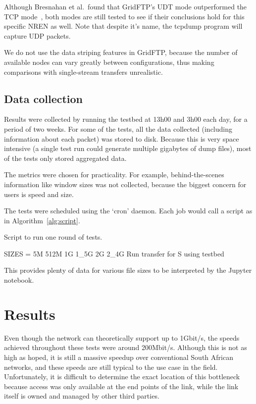 \documentclass{sig-alternate-05-2015}
\begin{document}
Although Bresnahan et al.\ found that GridFTP's UDT mode outperformed the TCP mode~\cite{bresnahan2009udt}, both modes are still tested to see if their conclusions hold for this specific NREN as well. Note that despite it's name, the tcpdump program will capture UDP packets.

We do not use the data striping features in GridFTP, because the number of available nodes can vary greatly between configurations, thus making comparisons with single-stream transfers unrealistic.

\subsection{Data collection}
Results were collected by running the testbed at 13h00 and 3h00 each day, for a period of two weeks. For some of the tests, all the data collected (including information about each packet) was stored to disk. Because this is very space intensive (a single test run could generate multiple gigabytes of dump files), most of the tests only stored aggregated data. 

The metrics were chosen for practicality. For example, behind-the-scenes information like window sizes was not collected, because the biggest concern for users is speed and size.

The tests were scheduled using the `cron' daemon. Each job would call a script as in Algorithm~\ref{alg:script}.

\begin{algorithm}[h]
\caption{Script to run one round of tests.}
	\begin{algorithmic}
		\STATE SIZES = 5M 512M 1G 1\_5G 2G 2\_4G
		\STATE Run transfer for S using testbed
		\ENDFOR
		\ENDFOR
	\end{algorithmic}
\label{alg:script}
\end{algorithm}

This provides plenty of data for various file sizes to be interpreted by the Jupyter notebook.

\section{Results}

Even though the network can theoretically support up to 1Gbit/s, the speeds achieved throughout these tests were around 200Mbit/s. Although this is not as high as hoped, it is still a massive speedup over conventional South African networks, and these speeds are still typical to the use case in the field. Unfortunately, it is difficult to determine the exact location of this bottleneck because access was only available at the end points of the link, while the link itself is owned and managed by other third parties.
\end{document}
